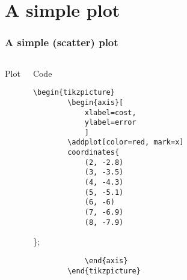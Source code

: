 \documentclass{beamer}
\begin{document}
\section{A simple plot}
\begin{frame}[fragile]
\frametitle{A simple (scatter) plot}
\begin{columns}
\begin{block}{Plot}
\end{block}
\begin{block}{Code}
\tiny{
\begin{verbatim}
\begin{tikzpicture}
		\begin{axis}[
			xlabel=cost, 
			ylabel=error
			]
		\addplot[color=red, mark=x]
		coordinates{
			(2, -2.8)
			(3, -3.5)
			(4, -4.3)
			(5, -5.1)
			(6, -6)
			(7, -6.9)
			(8, -7.9)
\end{verbatim}
			{\color{blue}\};}
\begin{verbatim}
			\end{axis}
		\end{tikzpicture}
\end{verbatim}
}
\end{block}
\end{columns}
\end{frame}
\end{document}
